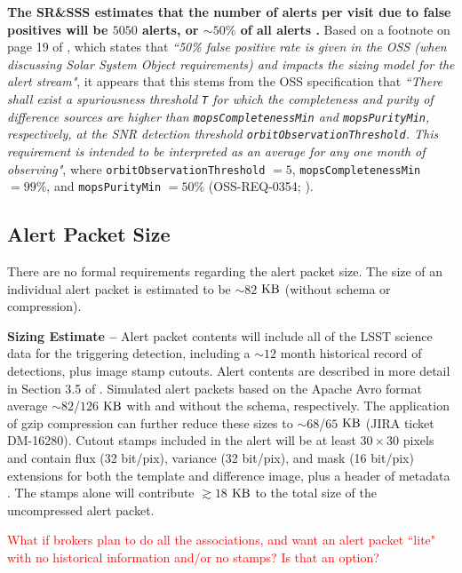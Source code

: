 \documentclass[DM,authoryear,toc]{lsstdoc}
\begin{document}
{\bf The SR\&SSS estimates that the number of alerts per visit due to false positives will be $5050$ alerts, or $\sim50\%$ of all alerts .} Based on a footnote on page 19 of , which states that {\it ``50\% false positive rate is given in the OSS (when discussing Solar System Object requirements) and impacts the sizing model for the alert stream"}, it appears that this stems from the OSS specification that {\it ``There shall exist a spuriousness threshold {\tt T} for which the completeness and purity of difference sources are higher than {\tt mopsCompletenessMin} and {\tt mopsPurityMin}, respectively, at the SNR detection threshold {\tt orbitObservationThreshold}. This requirement is intended to be interpreted as an average for any one month of observing"}, where {\tt orbitObservationThreshold} $=5$, {\tt mopsCompletenessMin} $=99\%$, and {\tt mopsPurityMin} $=50\%$ (OSS-REQ-0354; ).


\subsection{Alert Packet Size}\label{ssec:packet_size}

There are no formal requirements regarding the alert packet size. The size of an individual alert packet is estimated to be $\sim82$ $\rm KB$ (without schema or compression).

{\bf Sizing Estimate --} Alert packet contents will include all of the LSST science data for the triggering detection, including a $\sim12$ month historical record of detections, plus image stamp cutouts. Alert contents are described in more detail in Section 3.5 of . Simulated alert packets based on the Apache Avro format average $\sim82$/$126$ $\rm KB$ with and without the schema, respectively. The application of gzip compression can further reduce these sizes to $\sim68$/$65$ $\rm KB$ (JIRA ticket DM-16280). Cutout stamps included in the alert will be at least $30\times30$ pixels and contain flux (32 bit/pix), variance (32 bit/pix), and mask (16 bit/pix) extensions for both the template and difference image, plus a header of metadata . The stamps alone will contribute $\gtrsim18$ $\rm KB$ to the total size of the uncompressed alert packet. 

\textcolor{red}{What if brokers plan to do all the associations, and want an alert packet ``lite" with no historical information and/or no stamps? Is that an option?}
\end{document}
